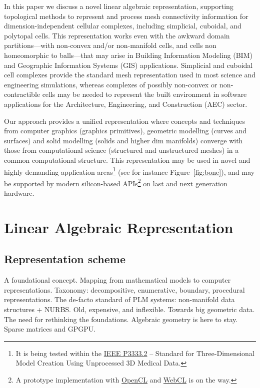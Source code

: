 \documentclass[11pt,oneside]{article}    %
\begin{document}
In this paper we discuss a novel linear algebraic representation, supporting topological methods to represent and process mesh connectivity information for dimension-independent cellular complexes, including simplicial, cuboidal, and polytopal cells. This representation works even with the awkward domain partitions---with non-convex and/or non-manifold cells, and cells non homeomorphic to balls---that may arise in Building Information Modeling (BIM) and Geographic Information Systems (GIS) applications. Simplicial and cuboidal cell complexes provide the standard mesh representation used in most science and engineering simulations, whereas complexes of possibly non-convex or non-contractible cells may be needed to represent the built environment in software applications for the Architecture, Engineering, and Construction (AEC) sector.

Our approach provides a unified representation where concepts and techniques from computer graphics (graphics primitives), geometric modelling (curves and surfaces) and solid modelling (solids and higher dim manifolds) converge with those from computational science (structured and unstructured meshes) in a common computational structure. This representation may be used in novel and highly demanding application areas\footnote{It is being tested within the \href{http://standards.ieee.org/develop/project/3333.2.html}{IEEE P3333.2} -- Standard for Three-Dimensional Model Creation Using Unprocessed 3D Medical Data.} (see for instance Figure~\ref{fig:bone}), and may be supported by modern silicon-based APIs\footnote{A prototype implementation with  \href{http://www.khronos.org/opencl/}{OpenCL} and \href{http://www.khronos.org/webcl/}{WebCL} is on the way.} on last and next generation hardware.


\section{Linear Algebraic Representation}\label{sec:lar}
\subsection{Representation scheme}
A foundational concept. Mapping from mathematical models to computer representations. 
Taxonomy: decompositive, enumerative, boundary, procedural representations.
The de-facto standard of PLM systems: non-manifold data structures + NURBS. 
Old, expensive, and inflexible.
Towards big geometric data. The need for rethinking the foundations. 
Algebraic geometry is here to stay. Sparse matrices and GPGPU.
\end{document}
